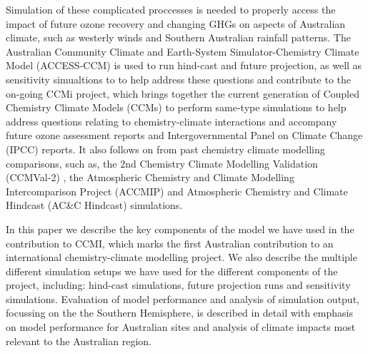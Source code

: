 Simulation of these complicated proccesses is needed to properly access the impact of future ozone recovery and changing GHGs on aspects of Australian climate, such as westerly winds and Southern Australian rainfall patterns. The Australian Community Climate and Earth-System Simulator-Chemistry Climate Model (ACCESS-CCM) is used to run hind-cast and future projection, as well as sensitivity simualtions to to help address these questions and contribute to the on-going CCMi project, which brings together the current generation of Coupled Chemistry Climate Models (CCMs) to perform same-type simulations to help address questions relating to chemistry-climate interactions and accompany future ozone assessment reports and Intergovernmental Panel on Climate Change (IPCC) reports. It also follows on from past chemistry climate modelling comparisons, such as, the 2nd Chemistry Climate Modelling Validation (CCMVal-2) \citep{CCMVal:uf}, the Atmospheric Chemistry and Climate Modelling Intercomparison Project (ACCMIP) \citep{Lamarque:2013jm} and Atmospheric Chemistry and Climate Hindcast (AC&C Hindcast) simulations. 

In this paper we describe the key components of the model we have used in the contribution to CCMI, which marks the first Australian contribution to an international chemistry-climate modelling project. We also describe the multiple different simulation setups we have used for the different components of the project, including: hind-cast simulations, future projection runs and sensitivity simulations. Evaluation of model performance and analysis of simulation output, focussing on the the Southern Hemisphere, is described in detail with emphasis on model performance for Australian sites and analysis of climate impacts most relevant to the Australian region.